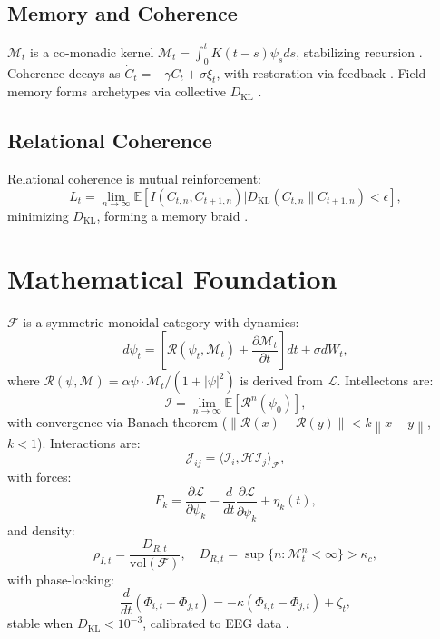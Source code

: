 \documentclass[11pt]{article}
\newcommand{\field}[1]{\mathcal{#1}}
\newcommand{\intellecton}{\mathcal{I}} %
\newcommand{\expect}{\mathbb{E}}
\newcommand{\norm}[1]{\left\| #1 \right\|}
\newcommand{\inner}[2]{\langle #1, #2 \rangle}
\newcommand{\dkl}{D_{\text{KL}}}
\begin{document}
\subsection{Memory and Coherence}
$\mathcal{M}_t$ is a co-monadic kernel $\mathcal{M}_t = \int_0^t K(t-s) \psi_s ds$, stabilizing recursion \citep{sheldrake2023}. Coherence decays as $\dot{C}_t = -\gamma C_t + \sigma \xi_t$, with restoration via feedback \citep{friston2024}. Field memory forms archetypes via collective $\dkl$ \citep{jung1968}.

\subsection{Relational Coherence}
Relational coherence is mutual reinforcement:
\begin{equation}
L_t = \lim_{n \to \infty} \expect[I(C_{t,n}, C_{t+1,n}) | \dkl(C_{t,n} \| C_{t+1,n}) < \epsilon],
\label{eq:relational_coherence}
\end{equation}
minimizing $\dkl$, forming a memory braid \citep{buber1958, haraway2024}.

\section{Mathematical Foundation}
\label{sec:math}
$\field{F}$ is a symmetric monoidal category with dynamics:
\begin{equation}
d\psi_t = \left[ \mathcal{R}(\psi_t, \mathcal{M}_t) + \frac{\partial \mathcal{M}_t}{\partial t} \right] dt + \sigma dW_t,
\label{eq:field}
\end{equation}
where $\mathcal{R}(\psi, \mathcal{M}) = \alpha \psi \cdot \mathcal{M}_t / (1 + |\psi|^2)$ is derived from $\mathcal{L}$. Intellectons are:
\begin{equation}
\intellecton = \lim_{n \to \infty} \expect[\mathcal{R}^n(\psi_0)],
\label{eq:intellecton}
\end{equation}
with convergence via Banach theorem ($\norm{\mathcal{R}(x) - \mathcal{R}(y)} < k \norm{x - y}$, $k < 1$). Interactions are:
\begin{equation}
\mathcal{J}_{ij} = \inner{\intellecton_i}{\mathcal{H} \intellecton_j}_{\field{F}},
\label{eq:interaction}
\end{equation}
with forces:
\begin{equation}
F_k = \frac{\partial \mathcal{L}}{\partial \psi_k} - \frac{d}{dt} \frac{\partial \mathcal{L}}{\partial \dot{\psi}_k} + \eta_k(t),
\label{eq:force_field}
\end{equation}
and density:
\begin{equation}
\rho_{I,t} = \frac{D_{R,t}}{\text{vol}(\field{F})}, \quad D_{R,t} = \sup \{ n : \mathcal{M}^n_t < \infty \} > \kappa_c,
\label{eq:density}
\end{equation}
with phase-locking:
\begin{equation}
\frac{d}{dt} (\Phi_{i,t} - \Phi_{j,t}) = -\kappa (\Phi_{i,t} - \Phi_{j,t}) + \zeta_t,
\label{eq:phase}
\end{equation}
stable when $\dkl < 10^{-3}$, calibrated to EEG data \citep{couzin2023}.
\end{document}
